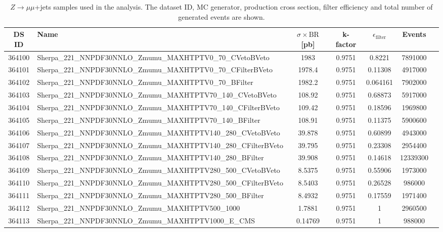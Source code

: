 \begin{landscape}
\begin{table}[!htb]
	\caption{$Z \to \mu\mu$+jets samples used in the analysis. The dataset ID, MC generator, production cross section, filter efficiency and total number of generated events are shown.}
	\label{tabular:mc_samples_Zmumujets}
	\begin{footnotesize}
		\begin{center}
			\begin{tabular}{|c|l|c|c|c|c|r|}
				\hline
				DS ID & Name & $\sigma\times\text{BR}$ [pb] & k-factor & $\epsilon_{\text{filter}}$ & Events \\ \hline
				364100 & Sherpa\_221\_NNPDF30NNLO\_Zmumu\_MAXHTPTV0\_70\_CVetoBVeto & 1983 & 0.9751 & 0.8221 & 7891000 \\
				364101 & Sherpa\_221\_NNPDF30NNLO\_Zmumu\_MAXHTPTV0\_70\_CFilterBVeto & 1978.4 & 0.9751 & 0.11308 & 4917000 \\
				364102 & Sherpa\_221\_NNPDF30NNLO\_Zmumu\_MAXHTPTV0\_70\_BFilter & 1982.2 & 0.9751 & 0.064161 & 7902000 \\
				364103 & Sherpa\_221\_NNPDF30NNLO\_Zmumu\_MAXHTPTV70\_140\_CVetoBVeto & 108.92 & 0.9751 & 0.68873 & 5917000 \\
				364104 & Sherpa\_221\_NNPDF30NNLO\_Zmumu\_MAXHTPTV70\_140\_CFilterBVeto & 109.42 & 0.9751 & 0.18596 & 1969800 \\
				364105 & Sherpa\_221\_NNPDF30NNLO\_Zmumu\_MAXHTPTV70\_140\_BFilter & 108.91 & 0.9751 & 0.11375 & 5900600 \\
				364106 & Sherpa\_221\_NNPDF30NNLO\_Zmumu\_MAXHTPTV140\_280\_CVetoBVeto & 39.878 & 0.9751 & 0.60899 & 4943000 \\
				364107 & Sherpa\_221\_NNPDF30NNLO\_Zmumu\_MAXHTPTV140\_280\_CFilterBVeto & 39.795 & 0.9751 & 0.23308 & 2954400 \\
				364108 & Sherpa\_221\_NNPDF30NNLO\_Zmumu\_MAXHTPTV140\_280\_BFilter & 39.908 & 0.9751 & 0.14618 & 12339300 \\
				364109 & Sherpa\_221\_NNPDF30NNLO\_Zmumu\_MAXHTPTV280\_500\_CVetoBVeto & 8.5375 & 0.9751 & 0.55906 & 1973000 \\
				364110 & Sherpa\_221\_NNPDF30NNLO\_Zmumu\_MAXHTPTV280\_500\_CFilterBVeto & 8.5403 & 0.9751 & 0.26528 & 986000 \\
				364111 & Sherpa\_221\_NNPDF30NNLO\_Zmumu\_MAXHTPTV280\_500\_BFilter & 8.4932 & 0.9751 & 0.17559 & 1971400 \\
				364112 & Sherpa\_221\_NNPDF30NNLO\_Zmumu\_MAXHTPTV500\_1000 & 1.7881 & 0.9751 & 1 & 2960500 \\
				364113 & Sherpa\_221\_NNPDF30NNLO\_Zmumu\_MAXHTPTV1000\_E\_CMS & 0.14769 & 0.9751 & 1 & 988000 \\
				\hline
			\end{tabular}
		\end{center}
	\end{footnotesize}
\end{table}


\end{landscape}
